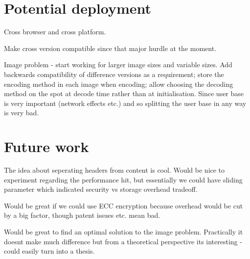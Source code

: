 \section{Potential deployment}
\label{sec:deploy}

Cross browser and cross platform.

Make cross version compatible since that major hurdle at the moment.

Image problem - start working for larger image sizes and variable sizes. Add backwards compatibility of difference versions as a requirement; store the encoding method in each image when encoding; allow choosing the decoding method on the spot at decode time rather than at initialisation. Since user base is very important (network effects etc.) and so splitting the user base in any way is very bad.



\section{Future work}
\label{sec:future}

The idea about seperating headers from content is cool. Would be nice to experiment regarding the performance hit, but essentially we could have sliding parameter which indicated security vs storage overhead tradeoff.

Would be great if we could use ECC encryption because overhead would be cut by a big factor, though patent issues etc. mean bad.

Would be great to find an optimal solution to the image problem. Practically it doesnt make much difference but from a theoretical perspective its interesting - could easily turn into a thesis.







